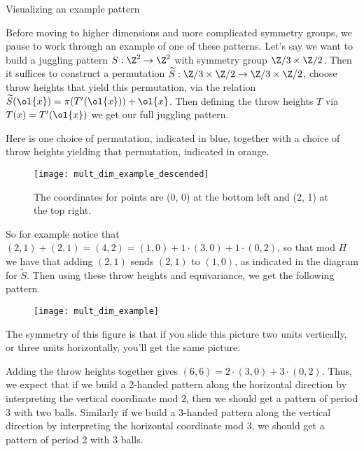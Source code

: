 \documentclass[12nt]{article}
\theoremstyle{plain}
\begin{document}
\newpage

\begin{subsection}{Visualizing an example pattern}

Before moving to higher dimensions and more complicated symmetry groups, we pause to work through an example of one of these patterns. Let's say we want to build a juggling pattern $S : \Z^2 \to \Z^2$ with symmetry group $\Z/3 \times \Z/2$. Then it suffices to construct a permutation $\widetilde{S} : \Z/3 \times \Z/2 \to \Z/3 \times \Z/2$, choose throw heights that yield this permutation, via the relation $\widetilde{S}(\ol{x}) = \pi(T'(\ol{x})) + \ol{x}$. Then defining the throw heights $T$ via $T(x) = T'(\ol{x})$ we get our full juggling pattern.

Here is one choice of permutation, indicated in blue, together with a choice of throw heights yielding that permutation, indicated in orange.

\begin{figure}[h]
\texttt{[image: mult\_dim\_example\_descended]}
\caption{The coordinates for points are (0, 0) at the bottom left and (2, 1) at the top right.}
\end{figure}
So for example notice that $(2, 1) + (2, 1) = (4, 2) = (1, 0) + 1\cdot(3, 0) + 1 \cdot (0, 2)$, so that mod $H$ we have that adding $(2, 1)$ sends $(2, 1)$ to $(1, 0)$, as indicated in the diagram for $\widetilde{S}$. Then using these throw heights and equivariance, we get the following pattern. 

\begin{figure}[h]
\texttt{[image: mult\_dim\_example]}
\end{figure}

\newpage
The symmetry of this figure is that if you slide this picture two units vertically, or three units horizontally, you'll get the same picture. 

Adding the throw heights together gives $(6, 6) = 2 \cdot (3, 0) + 3 \cdot (0, 2)$. Thus, we expect that if we build a 2-handed pattern along the horizontal direction by interpreting the vertical coordinate mod $2$, then we should get a pattern of period 3 with two balls. Similarly if we build a 3-handed pattern along the vertical direction by interpreting the horizontal coordinate mod 3, we should get a pattern of period 2 with 3 balls.


\end{subsection}
\end{document}
